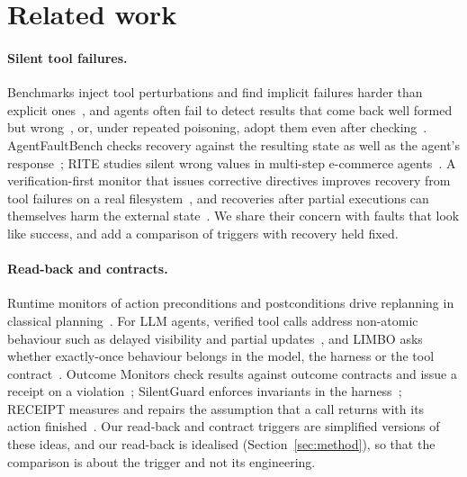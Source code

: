 \section{Related work}\label{sec:related}
\paragraph{Silent tool failures.} Benchmarks inject tool perturbations and find implicit failures
harder than explicit ones~\cite{zhu2026tools}, and agents often fail to detect results that come back
well formed but wrong~\cite{kraishan2026loud}, or, under repeated poisoning, adopt them
even after checking~\cite{anon2026tools}. AgentFaultBench checks recovery against the resulting state as well as the
agent's response~\cite{gupta2026agentfaultbench}; RITE studies silent wrong values in multi-step
e-commerce agents~\cite{zhang2026rite}. A verification-first monitor that issues corrective directives
improves recovery from tool failures on a real filesystem~\cite{kaynar2026tools}, and recoveries after
partial executions can themselves harm the external state~\cite{trofimov2026agent}. We share their
concern with faults that look like success, and add a comparison of triggers with recovery held fixed.

\paragraph{Read-back and contracts.} Runtime monitors of action preconditions and postconditions drive
replanning in classical planning~\cite{cardoso2026rvreplan}. For LLM agents, verified tool calls address
non-atomic behaviour such as delayed visibility and partial updates~\cite{mansoor2026verified}, and
LIMBO asks whether exactly-once behaviour belongs in the model, the harness or the tool
contract~\cite{li2026where}. Outcome Monitors check results against outcome contracts and issue a
receipt on a violation~\cite{panthi2026outcome}; SilentGuard enforces invariants in the
harness~\cite{dip2026invariantaware}; RECEIPT measures and repairs the assumption that a call returns
with its action finished~\cite{yang2026receipt}. Our read-back and contract triggers are simplified
versions of these ideas, and our read-back is idealised (Section~\ref{sec:method}), so that the
comparison is about the trigger and not its engineering.


